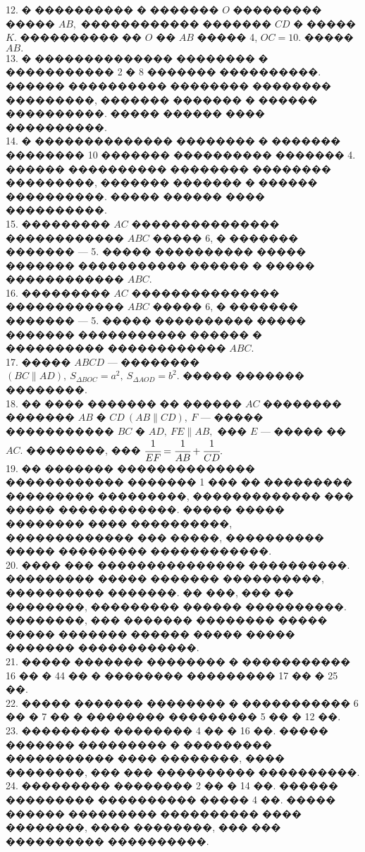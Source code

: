 \documentclass[12pt]{article}
\begin{document}
12. � ���������� � ������� $O$ ��������� ����� $AB,$ ������������ ������� $CD$ � ����� $K.$ ���������� ��  $O$ �� $AB$ ����� 4, $OC=10.$ ����� $AB.$\\
13. � �������������� �������� � ����������� 2 � 8 ������� ����������. ������ ���������� �������� �������� ���������, ������� ������� � ������ ����������. ����� ������ ���� ����������.\\
14. � �������������� �������� � ������� �������� 10 ������� ���������� ������� 4. ������ ���������� �������� �������� ���������, ������� ������� � ������ ����������. ����� ������ ���� ����������.\\
15. ��������� $AC$ ��������������� ������������ $ABC$ ����� 6, � ������� ������� --- 5. ����� ���������� ����� ������� ����������� ������ � ����� ������������ $ABC.$\\
16. ��������� $AC$ ��������������� ������������ $ABC$ ����� 6, � ������� ������� --- 5. ����� ���������� ����� ������� ����������� ������ � ���������� ������������ $ABC.$\\
17. ����� $ABCD$ --- �������� $(BC\parallel AD),\ S_{\Delta BOC}=a^2,\ S_{\Delta AOD}=b^2.$ ����� ������� ��������.\\
18. �� ���� ������� �� ������ $AC$ �������� ������� $AB$ � $CD\ (AB\parallel CD),\ F$ --- ����� ����������� $BC$ � $AD,\ FE\parallel AB,$ ��� $E$ --- ����� �� $AC.$ ��������, ��� $\cfrac{1}{EF}=\cfrac{1}{AB}+\cfrac{1}{CD}.$\\
19. �� ������� �������������� ������������ ������� 1 ��� �� ��������� ��������� ���������, ������������� ��� ����� ������������. ����� ����� �������� ���� ����������, ������������� ��� �����, ���������� ����� ��������� ������������.\\
20. ���� ��� ��������������� ����������. ��������� ����� ������� ����������, ���������� �������. �� ���, ��� �� ��������, ��������� ������ ����������. ��������, ��� ������� �������� ����� ����� ������� ������ ����� ����� ������� ������������.\\
21. ����� ������� �������� � ����������� 16 �� � 44 �� � �������� ��������� 17 �� � 25 ��.\\
22. ����� ������� �������� � ����������� 6 �� � 7 �� � �������� ��������� 5 �� � 12 ��.\\
23. ��������� �������� 4 �� � 16 ��. ����� ������� ��������� � ��������� ����������� ���� ��������, ���� ��������, ��� ��� ���������� ����������.\\
24. ��������� �������� 2 �� � 14 ��. ������ ��������� ���������� ����� 4 ��. ����� ������ ��������� ���������� ���� ��������, ���� ��������, ��� ��� ���������� ����������.\\
\end{document}
